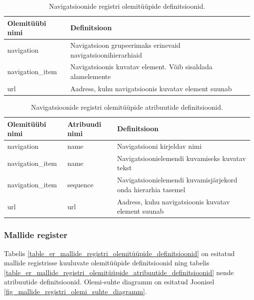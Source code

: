 \documentclass[a4paper,12pt]{article} %
\begin{document}
\begin{table}[H]
\centering
\caption{Navigatsioonide registri olemitüüpide definitsioonid.}
\label{table_er_navigatsioonide_registri_olemitüüpide_definitsioonid}
\begin{tabular}{|p{4cm}|p{11cm}|}
\hline
\rowcolor{rowgray}
Olemitüübi nimi & Definitsioon \\ \hline
navigation & Navigatsioon grupeerimaks erinevaid navigatsioonihierarhiaid \\ \hline
navigation\_item & Navigatsioonis kuvatav element. Võib sisaldada alamelemente \\ \hline
url & Aadress, kuhu navigatsioonis kuvatav element suunab \\ \hline
\end{tabular}
\end{table}

\begin{table}[H]
\centering
\caption{Navigatsioonide registri olemitüüpide atribuutide definitsioonid.}
\label{table_er_navigatsioonide_registri_olemitüüpide_atribuutide_definitsioonid}
\begin{tabular}{|p{4cm}|p{4cm}|p{7cm}|}
\hline
\rowcolor{rowgray}
Olemitüübi nimi & Atribuudi nimi & Definitsioon \\ \hline
navigation & name & Navigatsiooni kirjeldav nimi \\ \hline
navigation\_item & name & Navigatsioonielemendi kuvamiseks kuvatav tekst \\ \hline
navigation\_item & sequence & Navigatsioonielemendi kuvamisjärjekord onda hierarhia tasemel \\ \hline
url & url & Aadress, kuhu navigatsioonis kuvatav element suunab \\ \hline
\end{tabular}
\end{table}

\subsubsection{Mallide register}
Tabelis \ref{table_er_mallide_registri_olemitüüpide_definitsioonid} on esitatud mallide registrisse kuuluvate olemitüüpide definitsioonid ning tabelis \ref{table_er_mallide_registri_olemitüüpide_atribuutide_definitsioonid} nende atribuutide definitsioonid. Olemi-suhte diagramm on esitatud Joonisel \ref{fig_mallide_registri_olemi_suhte_diagramm}.
\end{document}
